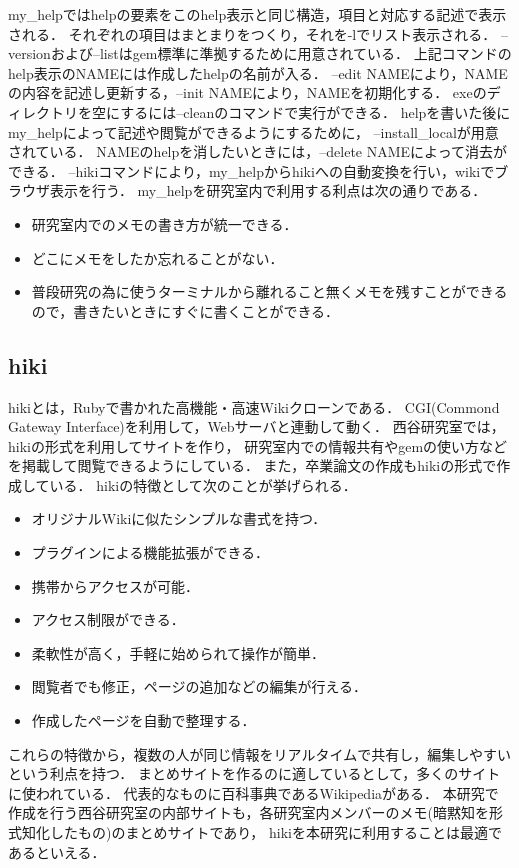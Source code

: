 my\_helpではhelpの要素をこのhelp表示と同じ構造，項目と対応する記述で表示される．
それぞれの項目はまとまりをつくり，それを-lでリスト表示される．
--versionおよび--listはgem標準に準拠するために用意されている．
上記コマンドのhelp表示のNAMEには作成したhelpの名前が入る．
--edit NAMEにより，NAMEの内容を記述し更新する，--init NAMEにより，NAMEを初期化する．
exeのディレクトリを空にするには--cleanのコマンドで実行ができる．
helpを書いた後にmy\_helpによって記述や閲覧ができるようにするために，
--install\_localが用意されている．
NAMEのhelpを消したいときには，--delete NAMEによって消去ができる．
--hikiコマンドにより，my\_helpからhikiへの自動変換を行い，wikiでブラウザ表示を行う．
my\_helpを研究室内で利用する利点は次の通りである．
\begin{itemize}
\item 研究室内でのメモの書き方が統一できる．
\item どこにメモをしたか忘れることがない．
\item 普段研究の為に使うターミナルから離れること無くメモを残すことができるので，書きたいときにすぐに書くことができる．
\end{itemize}

\subsection{hiki}
hikiとは，Rubyで書かれた高機能・高速Wikiクローンである\cite{d}．
CGI(Commond Gateway Interface)を利用して，Webサーバと連動して動く\cite{e}．
西谷研究室では，hikiの形式を利用してサイトを作り，
研究室内での情報共有やgemの使い方などを掲載して閲覧できるようにしている．
また，卒業論文の作成もhikiの形式で作成している．
hikiの特徴として次のことが挙げられる．
\begin{itemize}
\item オリジナルWikiに似たシンプルな書式を持つ．
\item プラグインによる機能拡張ができる\cite{f}．
\item 携帯からアクセスが可能．
\item アクセス制限ができる．
\item 柔軟性が高く，手軽に始められて操作が簡単\cite{g}．
\item 閲覧者でも修正，ページの追加などの編集が行える．
\item 作成したページを自動で整理する\cite{h}．
\end{itemize}
これらの特徴から，複数の人が同じ情報をリアルタイムで共有し，編集しやすいという利点を持つ．
まとめサイトを作るのに適しているとして，多くのサイトに使われている．
代表的なものに百科事典であるWikipediaがある．
本研究で作成を行う西谷研究室の内部サイトも，各研究室内メンバーのメモ(暗黙知を形式知化したもの)のまとめサイトであり，
hikiを本研究に利用することは最適であるといえる．
